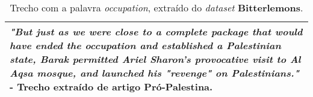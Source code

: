 \begin{table}[t]
\centering
\begin{tabular}{| p{10cm} | }
\hline
\emph{"But just as we were close to a complete
package that would have ended the \textbf{occupation} and established a
Palestinian state, Barak permitted Ariel Sharon's provocative visit to
Al Aqsa mosque, and launched his "revenge" on Palestinians."} - Trecho extraído de artigo Pró-Palestina. \\ \hline
\end{tabular}
\label{5}
\caption{Trecho com a palavra \emph{occupation}, extraído do \emph{dataset} \textbf{Bitterlemons}.}
\end{table}




